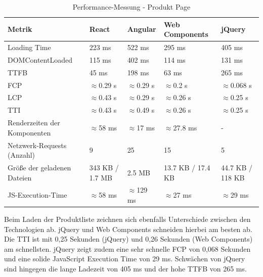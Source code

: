 \documentclass[oneside]{ausarbeitung}
\begin{document}
\begin{table}[H]
\centering
\caption{Performance-Messung - Produkt Page}
\begin{tabular}{|p{3.5cm}|p{2.5cm}|p{2.5cm}|p{2.5cm}|p{2.5cm}|}
\hline
\textbf{Metrik}                  & \textbf{React} & \textbf{Angular} & \textbf{Web Components} & \textbf{jQuery} \\ \hline
Loading Time                     & 223 ms        & 522 ms           & 295 ms                 & 405 ms          \\ \hline
DOMContentLoaded                 & 115 ms        & 402 ms           & 114 ms                 & 131 ms          \\ \hline
TTFB                             & 45 ms        & 198 ms           & 63 ms                  & 265 ms          \\ \hline
FCP                              & $\approx$0.29 s  & $\approx$0.29 s  & $\approx$0.2 s        & $\approx$0.068 s  \\ \hline
LCP                              & $\approx$0.43 s  & $\approx$0.29 s  & $\approx$0.26 s       & $\approx$0.25 s \\ \hline
TTI                              & $\approx$0.43 s  & $\approx$0.49 s  & $\approx$0.26 s       & $\approx$0.25 s \\ \hline
Renderzeiten der Komponenten     & $\approx$58 ms & $\approx$17 ms   & $\approx$27.8 ms          & -  \\ \hline
Netzwerk-Requests (Anzahl)       & 9              & 25               & 15                    & 5               \\ \hline
Größe der geladenen Dateien      & 343 KB / 1.7 MB & 2.5 MB          & 13.7 KB / 17.4 KB     & 44.7 KB / 118 KB \\ \hline
JS-Execution-Time                & $\approx$58 ms       & $\approx$129 ms          & $\approx$27 ms                & $\approx$29 ms         \\ \hline
\end{tabular}
\end{table}

Beim Laden der Produktliste zeichnen sich ebenfalls Unterschiede zwischen den Technologien ab. jQuery und Web Components schneiden hierbei am besten ab. Die TTI ist mit 0,25 Sekunden (jQuery) und 0,26 Sekunden (Web Components) am schnellsten. jQuery zeigt zudem eine sehr schnelle FCP von 0,068 Sekunden und eine solide JavaScript Execution Time von 29 ms. Schwächen von jQuery sind hingegen die lange Ladezeit von 405 ms und der hohe TTFB von 265 ms.
\end{document}
